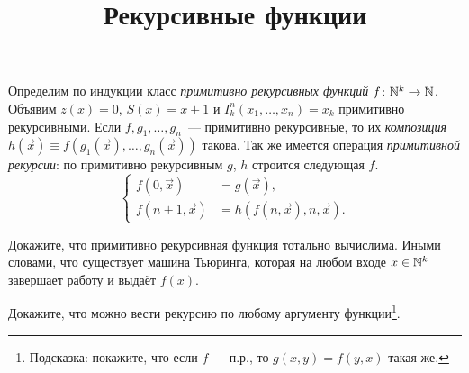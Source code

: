 \documentclass[a4paper, 12pt, num=Г1, date = 19.12.2018]{listok}
\begin{document}
\title{Рекурсивные функции}
\maketitle
\begin{definition}
	Определим по индукции класс \textit{примитивно рекурсивных функций $f \colon \mathbb{N}^k \to \mathbb{N}$}.
	Объявим $z(x) = 0$, $S(x) = x + 1$ и $I_k^n(x_1, \dots, x_n) = x_k$ примитивно рекурсивными.
	Если $f, g_1, \dots, g_n$~--- примитивно рекурсивные,
	то их \textit{композиция} $h(\vec x) \equiv f(g_1(\vec x), \dots, g_n(\vec x))$ такова.
	Так же имеется операция \textit{примитивной рекурсии}: по примитивно рекурсивным $g$, $h$ строится следующая $f$.
	\[
		\left \{
			\begin{aligned}
				f(0, \vec x) & = g(\vec x),\\
				f(n + 1, \vec x) & = h(f(n, \vec x), n, \vec x).
			\end{aligned}
		\right .
	\]
\end{definition}
\begin{problem}
	Докажите, что примитивно рекурсивная функция тотально вычислима.
	Иными словами, что существует машина Тьюринга, которая на любом входе $x \in \mathbb{N}^k$ завершает работу и выдаёт $f(x)$.
\end{problem}
\begin{problem}
	Докажите, что можно вести рекурсию по любому аргументу функции\footnote{Подсказка: покажите, что если $f$ --- п.р.,
	то $g(x, y) = f(y, x)$ такая же.}.
\end{problem}
\end{document}
